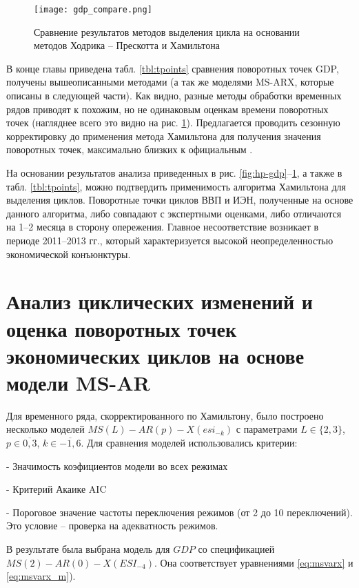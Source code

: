 \documentclass[../report.tex]{subfiles}
\begin{document}
	
	\begin{figure}
		\label{fig:gdp_compare}
		\texttt{[image: gdp\_compare.png]}
		\caption{Сравнение результатов методов выделения цикла на основании 
			методов Ходрика – Прескотта и Хамильтона}	
	\end{figure}
	
	В конце главы приведена табл. \ref{tbl:tpoints} сравнения поворотных точек GDP, получены вышеописанными методами (а так же моделями MS-ARX, которые описаны в следующей части). Как видно, разные методы обработки временных рядов приводят к похожим, но не одинаковым оценкам времени поворотных точек (нагляднее всего это видно на рис. \ref{fig:gdp_compare}). Предлагается проводить сезонную корректировку до применения метода Хамильтона для получения значения поворотных точек, максимально близких к официальным \cite{makarevich_hse_paper,makarevich_bsu_conf_2017}.
	
	На основании результатов анализа приведенных в рис. \ref{fig:hp-gdp}–\ref{fig:gdp_compare}, а также в табл. \ref{tbl:tpoints}, можно подтвердить применимость алгоритма Хамильтона для выделения циклов. Поворотные точки циклов ВВП и ИЭН, полученные на основе данного алгоритма, либо совпадают с экспертными оценками, либо отличаются на 1–2 месяца в сторону опережения. Главное несоответствие  возникает в периоде 2011–2013 гг., который характеризуется высокой неопределенностью экономической конъюнктуры.
	
	
	\section{Анализ циклических изменений и оценка поворотных точек экономических циклов на основе модели MS-AR}
	
	Для временного ряда, скорректированного по Хамильтону, было построено несколько моделей $MS(L)-AR(p)-X(esi_{-k})$ с параметрами $L \in \{2,3\}$, $p \in \overline{0,3}$, $k \in \overline{-1,6}$. Для сравнения моделей использовались критерии:
	
	- Значимость коэфициентов модели во всех режимах
	
	- Критерий Акаике AIC
	
	- Пороговое значение частоты переключения режимов (от 2 до 10 переключений). Это условие – проверка на адекватность режимов.
	
	В результате была выбрана модель для ${GDP}$ со спецификацией $MS(2)-AR(0)-X({ESI}_{-4})$. Она соответствует уравнениями \ref{eq:msvarx} и \ref{eq:msvarx_m}).
	
\end{document}
